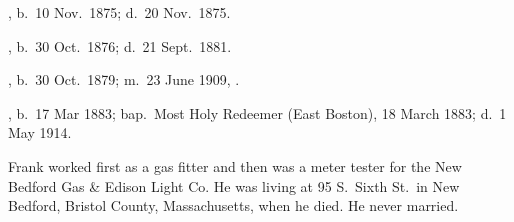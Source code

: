 \begin{Kids}
	
	, b.\ 10 Nov.\ 1875;\cite{Mary3OBrien2Birth} d.\ 20 Nov.\ 1875.\cite{Mary3OBrien2Death}
	
	, b.\ 30 Oct.\ 1876;\cite{John3OBrien2Birth} d.\ 21 Sept.\ 1881.\cite{John3OBrien2Death}
	
	, b.\ 30 Oct.\ 1879; m.\ 23 June 1909, .
	
	, b.\ 17 Mar 1883;\cite{Francis3OBrienBirth} bap.\ Most Holy Redeemer (East Boston), 18 March 1883;\cite{Francis3OBrienBaptism} d.\ 1 May 1914.\cite{Francis3OBrienDeath}
	
	\begin{KidsMoreText}
		Frank worked first as a gas fitter\cite{Census1900Francis3OBrien} and then was a meter tester for the New Bedford Gas \& Edison Light Co.\cite{Francis3OBrienDeath,Francis3OBrien1913} He was living at 95 S.\ Sixth St.\ in New Bedford, Bristol County, Massachusetts, when he died.\cite{Francis3OBrien1913} He never married.\cite{Francis3OBrienDeath}
	\end{KidsMoreText}
	
	\KidNum{}
	
	
\end{Kids}